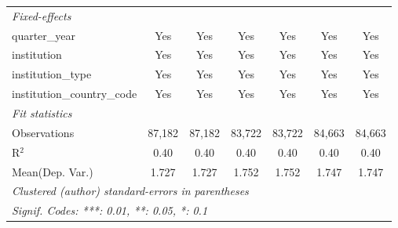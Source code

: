 \begin{tabular}{lcccccc}
   \midrule
   \emph{Fixed-effects}\\
   quarter\_year                      & Yes     & Yes         & Yes     & Yes      & Yes     & Yes\\  
   institution                        & Yes     & Yes         & Yes     & Yes      & Yes     & Yes\\  
   institution\_type                  & Yes     & Yes         & Yes     & Yes      & Yes     & Yes\\  
   institution\_country\_code         & Yes     & Yes         & Yes     & Yes      & Yes     & Yes\\  
   \midrule
   \emph{Fit statistics}\\
   Observations                       & 87,182  & 87,182      & 83,722  & 83,722   & 84,663  & 84,663\\  
   R$^2$                              & 0.40    & 0.40        & 0.40    & 0.40     & 0.40    & 0.40\\  
Mean(Dep. Var.) & 1.727 & 1.727 & 1.752 & 1.752 & 1.747 & 1.747 \\
   \midrule \midrule
   \multicolumn{7}{l}{\emph{Clustered (author) standard-errors in parentheses}}\\
   \multicolumn{7}{l}{\emph{Signif. Codes: ***: 0.01, **: 0.05, *: 0.1}}\\
\end{tabular}
\par\endgroup
